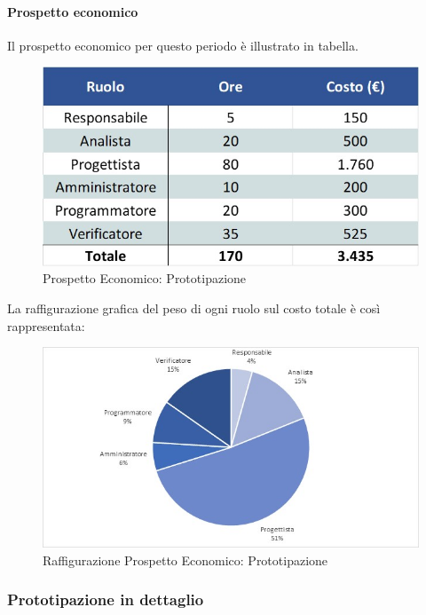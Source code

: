 \paragraph{Prospetto economico}
Il prospetto economico per questo periodo è illustrato in tabella. 
\begin{figure}[H]
	\centerline{\includegraphics[scale=0.7]{img/Preventivo/PrototipazioneEconomico.jpg}}
	\caption{Prospetto Economico: Prototipazione}
	\clearpage
\end{figure}
La raffigurazione grafica del peso di ogni ruolo sul costo totale è così rappresentata: 
\begin{figure}[H]
	\centerline{\includegraphics[scale=0.9]{img/Preventivo/Torte/Prototipazione.jpg}}
	\caption{Raffigurazione Prospetto Economico: Prototipazione}
	\clearpage
\end{figure}
\newpage
\subsubsection{Prototipazione in dettaglio}
